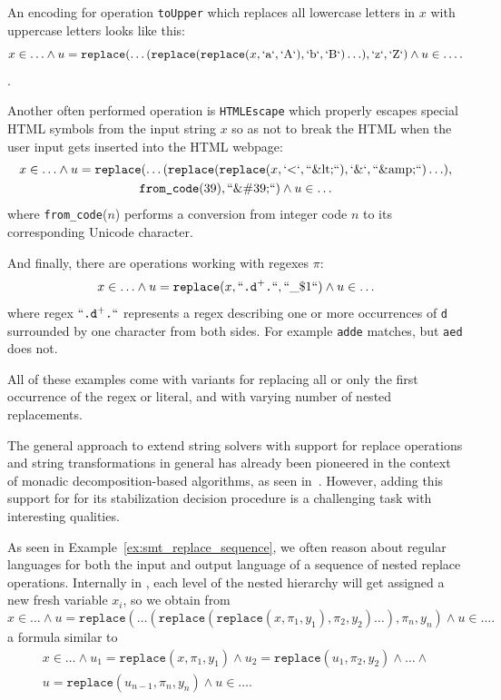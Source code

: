 \begin{example}\label{ex:smt_replace_sequence}
  An encoding for operation \texttt{toUpper} which replaces all lowercase letters in $x$ with uppercase letters looks like this:
  $$ x \in \ldots \land u = \texttt{replace}(\ldots (\texttt{replace}(\texttt{replace}(x, `\text{a}`, `\text{A}`), `\text{b}`, `\text{B}`)\ldots), `\text{z}`, `\text{Z}`)\land u \in \ldots \text{.}$$.

  Another often performed operation is \texttt{HTMLEscape} which properly escapes special HTML symbols from the input string $x$ so as not to break the HTML when the user input gets inserted into the HTML webpage:
  \begin{multline*}
  x \in \ldots \land u = \texttt{replace}(\ldots (\texttt{replace}(\texttt{replace}(x, `\text{<}`, ``\text{\&lt;}``), `\text{\&}`, ``\text{\&amp;}``)\ldots), \\
  \texttt{from\_code}(39), ``\text{\&\#39;}``)\land u \in \ldots
  \end{multline*}
  where \texttt{from\_code}($n$) performs a conversion from integer code $n$ to its corresponding Unicode character.

  And finally, there are operations working with regexes $\pi$:
  $$
    x \in \ldots \land u = \texttt{replace}(x, ``\texttt{.d}^+\texttt{.}``, ``\text{\_\$1}``)\land u \in \ldots
  $$
where regex $``\texttt{.d}^+\texttt{.}``$ represents a regex describing one or more occurrences of \texttt{d} surrounded by one character from both sides. For example \texttt{adde} matches, but \texttt{aed} does not.

All of these examples come with variants for replacing all or only the first occurrence of the regex or literal, and with varying number of nested replacements.

The general approach to extend string solvers with support for replace operations and string transformations in general has already been pioneered in the context of monadic decomposition-based algorithms, as seen in~\cite{AnthonyReplaceAll2018, Flatten, ChainFree, StringAFA}.
However, adding this support for \noodler for its stabilization decision procedure is a challenging task with interesting qualities.

\end{example}

As seen in Example~\ref{ex:smt_replace_sequence}, we often reason about regular languages for both the input and output language of a sequence of nested replace operations.
Internally in \noodler, each level of the nested hierarchy will get assigned a new fresh variable $x_i$, so we obtain from
$$
x \in \ldots \land u = \texttt{replace}(\ldots (\texttt{replace}(\texttt{replace}(x, \pi_1, y_1), \pi_2, y_2)\ldots), \pi_n, y_n) \land u \in \ldots \text{.}
$$
a formula similar to
\begin{multline*}
x \in \ldots \land u_1 = \texttt{replace}(x, \pi_1, y_1) \land u_2 = \texttt{replace}(u_1, \pi_2, y_2) \land \ldots \land \\u = \texttt{replace}(u_{n-1}, \pi_n, y_n) \land u \in \ldots \text{.}
\end{multline*}

